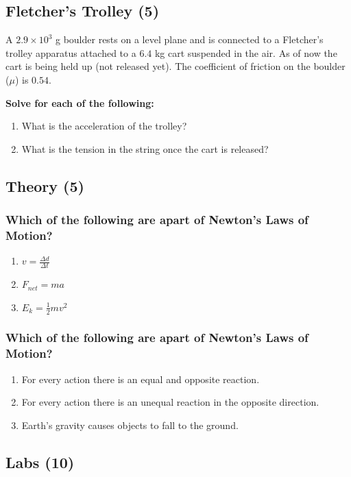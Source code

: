 \documentclass{article}
\begin{document}
\subsection{Fletcher's Trolley (5)}
A $2.9 \times 10^3$ g boulder rests on a level plane and is connected to a Fletcher's trolley apparatus
attached to a $6.4$ kg cart suspended in the air. As of now the cart is being held up (not released yet).
The coefficient of friction on the boulder ($\mu$) is $0.54$.

\vspace{10pt}

\noindent\textbf{Solve for each of the following:}
\begin{enumerate}[label=\alph*)]
    \item What is the acceleration of the trolley?
    \item What is the tension in the string once the cart is released?
\end{enumerate}\leavevmode

\subsection{Theory (5)}
\subsubsection{Which of the following are apart of Newton's Laws of Motion?}
\begin{enumerate}[label=\alph*)]
    \item $v = \frac{\Delta d}{\Delta t}$
    \item $F_{net} = ma$
    \item $E_{k} = \frac{1}{2}mv^2$
\end{enumerate}\leavevmode
\subsubsection{Which of the following are apart of Newton's Laws of Motion?}
\begin{enumerate}[label=\alph*)]
    \item For every action there is an equal and opposite reaction.
    \item For every action there is an unequal reaction in the opposite direction.
    \item Earth's gravity causes objects to fall to the ground.
\end{enumerate}

\subsection{Labs (10)}
\end{document}
